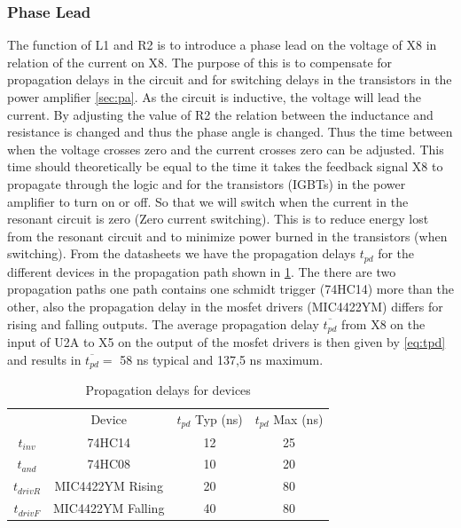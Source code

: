 \subsubsection{Phase Lead}
\label{sec:phaselead}
The function of L1 and R2 is to introduce a phase lead on the voltage of X8 in relation of the current on X8. The purpose of this is to compensate for propagation delays in the circuit and for switching delays in the transistors in the power amplifier \cref{sec:pa}. As the circuit is inductive, the voltage will lead the current. By adjusting the value of R2 the relation between the inductance and resistance is changed and thus the phase angle is changed. Thus the time between when the voltage crosses zero and the current crosses zero can be adjusted. This time should theoretically be equal to the time it takes the feedback signal X8 to propagate through the logic and for the transistors (IGBTs) in the power amplifier to turn on or off. So that we will switch when the current in the resonant circuit is zero (Zero current switching). This is to reduce energy lost from the resonant circuit and to minimize power burned in the transistors (when switching). From the datasheets we have the propagation delays $t_{pd}$ for the different devices in the propagation path shown in \cref{tab:tpd}. The there are two propagation paths one path contains one schmidt trigger (74HC14) more than the other, also the propagation delay in the mosfet drivers (MIC4422YM) differs for rising and falling outputs. The average propagation delay $\overline{t_{pd}}$ from X8 on the input of U2A to X5 on the output of the mosfet drivers is then given by \cref{eq:tpd} and results in $\overline{t_{pd}} =$ 58 ns typical and 137,5 ns maximum.

\begin{table}[H]
    \centering
    \begin{tabular}{c|c|c|c}
                &   Device              & $t_{pd}$ Typ (ns)   & $t_{pd}$ Max (ns) \\
        $t_{inv}$ &   74HC14              & 12            & 25\\
        $t_{and}$ &   74HC08              & 10            & 20\\
        $t_{driv R}$& MIC4422YM Rising    & 20            & 80\\
        $t_{driv F}$& MIC4422YM Falling   & 40            & 80
    \end{tabular}
    \caption{Propagation delays for devices}
    \label{tab:tpd}
\end{table}

